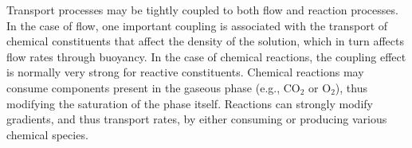 Transport processes may be tightly coupled to both flow and reaction processes.  
In the case of flow, one important coupling is associated with the transport of chemical 
constituents that affect the density of the solution, which in turn affects flow rates through buoyancy.
In the case of chemical reactions, the coupling effect is normally very strong for reactive constituents.  
Chemical reactions may consume components present in the gaseous phase (e.g., CO$_2$ or O$_2$), thus 
modifying the saturation of the phase itself.  
Reactions can strongly modify gradients, and thus transport rates, by either consuming 
or producing various chemical species.


